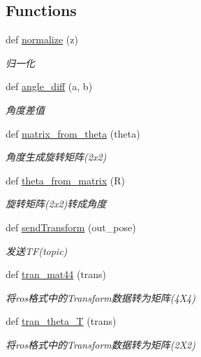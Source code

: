 \subsection*{Functions}
\begin{DoxyCompactItemize}
\item 
def \hyperlink{namespaceselect___a_af57dc18a5c3e1fa5b6c139c3b34f87e6}{normalize} (z)
\begin{DoxyCompactList}\small\item\em 归一化 \end{DoxyCompactList}\item 
def \hyperlink{namespaceselect___a_a5989337483bc940c36178192ccc31e24}{angle\+\_\+diff} (a, b)
\begin{DoxyCompactList}\small\item\em 角度差值 \end{DoxyCompactList}\item 
def \hyperlink{namespaceselect___a_af82b8a439f8a0fc85af273ad5cb344f0}{matrix\+\_\+from\+\_\+theta} (theta)
\begin{DoxyCompactList}\small\item\em 角度生成旋转矩阵(2x2) \end{DoxyCompactList}\item 
def \hyperlink{namespaceselect___a_a14f08d343911cbc4ee69e505d95a0d9e}{theta\+\_\+from\+\_\+matrix} (R)
\begin{DoxyCompactList}\small\item\em 旋转矩阵(2x2)转成角度 \end{DoxyCompactList}\item 
def \hyperlink{namespaceselect___a_a779a9d7134fa12ee8f82a95ec7ea63ef}{send\+Transform} (out\+\_\+pose)
\begin{DoxyCompactList}\small\item\em 发送\+T\+F(topic) \end{DoxyCompactList}\item 
def \hyperlink{namespaceselect___a_a594e20b4e7f4e7abe32a02dc06d596e0}{tran\+\_\+mat44} (trans)
\begin{DoxyCompactList}\small\item\em 将ros格式中的\+Transform数据转为矩阵(4\+X4) \end{DoxyCompactList}\item 
def \hyperlink{namespaceselect___a_a810b4d9f7014249a97f5f10d65635eb8}{tran\+\_\+theta\+\_\+T} (trans)
\begin{DoxyCompactList}\small\item\em 将ros格式中的\+Transform数据转为矩阵(2\+X2) \end{DoxyCompactList}\item 

\end{DoxyCompactItemize}

